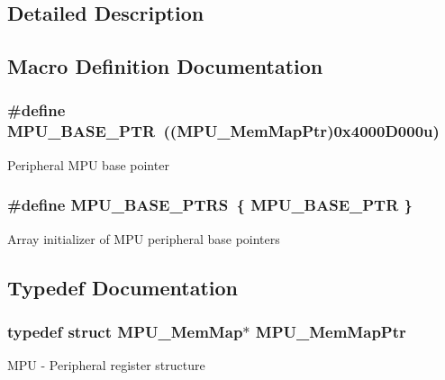 \subsection{Detailed Description}


\subsection{Macro Definition Documentation}
\hypertarget{group___m_p_u___peripheral_gae2d60f80178d84225d77e5f0214d1f1d}{}
\subsubsection[{M\+P\+U\+\_\+\+B\+A\+S\+E\+\_\+\+P\+T\+R}]{\setlength{\rightskip}{0pt plus 5cm}\#define M\+P\+U\+\_\+\+B\+A\+S\+E\+\_\+\+P\+T\+R~(({\bf M\+P\+U\+\_\+\+Mem\+Map\+Ptr})0x4000\+D000u)}\label{group___m_p_u___peripheral_gae2d60f80178d84225d77e5f0214d1f1d}
Peripheral M\+P\+U base pointer \hypertarget{group___m_p_u___peripheral_ga78460c4504e0b1effc8715d3fdb92f25}{}
\subsubsection[{M\+P\+U\+\_\+\+B\+A\+S\+E\+\_\+\+P\+T\+R\+S}]{\setlength{\rightskip}{0pt plus 5cm}\#define M\+P\+U\+\_\+\+B\+A\+S\+E\+\_\+\+P\+T\+R\+S~\{ {\bf M\+P\+U\+\_\+\+B\+A\+S\+E\+\_\+\+P\+T\+R} \}}\label{group___m_p_u___peripheral_ga78460c4504e0b1effc8715d3fdb92f25}
Array initializer of M\+P\+U peripheral base pointers 

\subsection{Typedef Documentation}
\hypertarget{group___m_p_u___peripheral_gac3cd3449552560380e80c90b2207d18b}{}
\subsubsection[{M\+P\+U\+\_\+\+Mem\+Map\+Ptr}]{\setlength{\rightskip}{0pt plus 5cm}typedef struct {\bf M\+P\+U\+\_\+\+Mem\+Map}$\ast$ {\bf M\+P\+U\+\_\+\+Mem\+Map\+Ptr}}\label{group___m_p_u___peripheral_gac3cd3449552560380e80c90b2207d18b}
M\+P\+U -\/ Peripheral register structure 